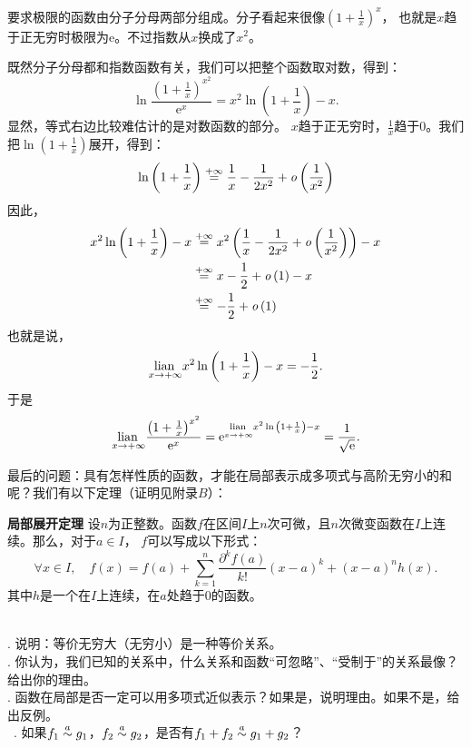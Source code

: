 \documentclass[12pt,UTF8,fontset=none]{ctexbook}
\begin{document}
\begin{so}
    要求极限的函数由分子分母两部分组成。分子看起来很像$\left(1 + \frac{1}{x}\right)^{x}$，
    也就是$x$趋于正无穷时极限为$\mathrm{e}$。不过指数从$x$换成了$x^2$。

    既然分子分母都和指数函数有关，我们可以把整个函数取对数，得到：
    $$ \ln{\frac{\left(1 + \frac{1}{x}\right)^{x^2}}{\mathrm{e}^x}} = x^2 \ln{\left(1 + \frac{1}{x}\right)} - x.$$
    显然，等式右边比较难估计的是对数函数的部分。
    $x$趋于正无穷时，$\frac{1}{x}$趋于$0$。我们把$\ln{\left(1 + \frac{1}{x}\right)}$展开，得到：
    $$ \ln{\left(1 + \frac{1}{x}\right)} \overset{+\infty}{=} \frac{1}{x} - \frac{1}{2x^2} + \mathit{o}\left(\frac{1}{x^2}\right)$$
    因此，
    \begin{align*}
        x^2 \ln{\left(1 + \frac{1}{x}\right)} - x &\overset{+\infty}{=} x^2 \left(\frac{1}{x} - \frac{1}{2x^2} + \mathit{o}\left(\frac{1}{x^2}\right)\right) - x  \\
        &\overset{+\infty}{=} x -\frac{1}{2} + \mathit{o}\left(1\right) - x  \\
        &\overset{+\infty}{=} -\frac{1}{2} + \mathit{o}\left(1\right) 
    \end{align*}
    也就是说，
    $$ \underset{x\to +\infty}{\operatorname{lian}\,} x^2 \ln{\left(1 + \frac{1}{x}\right)} - x = -\frac{1}{2}. $$
    于是
    $$ \underset{x\to +\infty}{\operatorname{lian}\,} \frac{\left(1 + \frac{1}{x}\right)^{x^2}}{\mathrm{e}^x} = \mathrm{e}^{\underset{x\to +\infty}{\operatorname{lian}\,}  x^2 \ln{\left(1 + \frac{1}{x}\right)} - x} = \frac{1}{\sqrt{\mathrm{e}}}. $$
\end{so}

最后的问题：具有怎样性质的函数，才能在局部表示成多项式与高阶无穷小的和呢？我们有以下定理（证明见附录$B$）：
\begin{tm}{\textbf{局部展开定理}}
    设$n$为正整数。函数$f$在区间$I$上$n$次可微，且$n$次微变函数在$I$上连续。那么，对于$a\in I$，
    $f$可以写成以下形式：
    $$ \forall x \in I , \quad f(x) = f(a) + \sum_{k=1}^n \frac{\partial^k f (a)}{k!}(x - a)^k + (x - a)^n h(x). $$
    其中$h$是一个在$I$上连续，在$a$处趋于$0$的函数。
\end{tm}

\begin{sk}
    \mbox{} \\
    . 说明：等价无穷大（无穷小）是一种等价关系。\\
    . 你认为，我们已知的关系中，什么关系和函数“可忽略”、“受制于”的关系最像？给出你的理由。\\
    . 函数在局部是否一定可以用多项式近似表示？如果是，说明理由。如果不是，给出反例。\\\
    . 如果$f_1 \overset{a}{\sim} g_1$，$f_2\overset{a}{\sim} g_2$，是否有$f_1 + f_2\overset{a}{\sim} g_1 + g_2$？
\end{sk}
\end{document}
